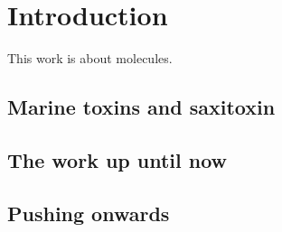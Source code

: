 \chapter{Introduction}

This work is about molecules.

\section{Marine toxins and saxitoxin}

\blindtext[8]


\section{The work up until now}

\blindtext[5]


\section{Pushing onwards}

\blindtext[5]

